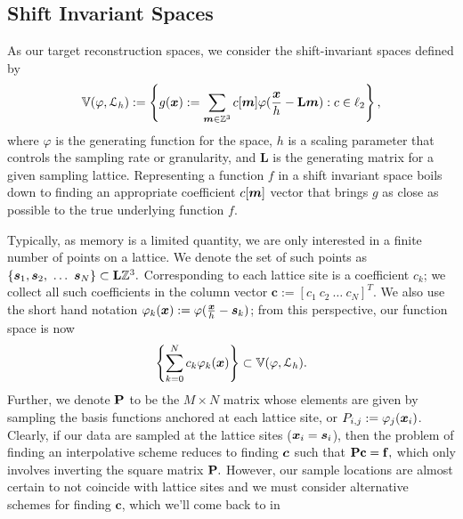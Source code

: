 \subsection{Shift Invariant Spaces} \label{sec:sis_review}
As our target reconstruction spaces, we consider the shift-invariant spaces defined by {\small 
\begin{equation*}
	\mathbb{V}(\varphi,  \mathcal{L}_h) := \left\{ g(\boldsymbol{x}) := \displaystyle\sum_{\boldsymbol{m} \in \mathbb{Z}^3} c[\boldsymbol{m}]\varphi(\frac{\boldsymbol{x}}{h} - \mathbf{L}\boldsymbol{m}) : c \in \ell_2 \right\},
\end{equation*}}
where $\varphi$ is the generating function for the space, $h$ is a scaling parameter that controls the sampling rate or granularity, and $\mathbf{L}$ is the generating matrix for a given sampling lattice.
Representing a function $f$ in a shift invariant space boils down to finding an appropriate coefficient $c[\boldsymbol{m}]$ vector that brings $g$ as close as possible to the true underlying function $f$. 

Typically, as memory is a limited quantity, we are only interested in a finite number of points on a lattice. 
We denote the set of such points as $\{\vect{s}_1,\vect{s}_2,\ \hdots  \ \vect{s}_N\} \subset \mathbf{L}\intn^3.$ 
Corresponding to each lattice site is a coefficient $c_k$; we collect all such coefficients in the column vector $\mathbf{c}:=\left[c_1 \ c_2 \ \hdots \ c_N \right]^T.$ 
We also use the short hand notation $\varphi_k(\boldsymbol{x}) := \varphi(\frac{\boldsymbol{x}}{h}-\boldsymbol{s}_k)$; from this perspective, our function space is now {\small 
\begin{equation}
	\left\{ \displaystyle\sum_{k=0}^N c_k \varphi_k(\boldsymbol{x}) \right\} \subset \mathbb{V}(\varphi, \mathcal{L}_h).
\end{equation}}
Further, we denote $\mathbf{\mathbf{P}}$ to be the $M \times N$ matrix whose elements are given by sampling the basis functions anchored at each lattice site, or $P_{i,j} := \varphi_j(\boldsymbol{x}_i)$. 
Clearly, if our data are sampled at the lattice sites ($\boldsymbol{x}_i = \boldsymbol{s}_i$), then the problem of finding an interpolative scheme reduces to finding $\boldsymbol{c}$ such that $\mathbf{\mathbf{P} c=f},$ which only involves inverting the square matrix $\mathbf{\mathbf{P}}.$ 
However, our sample locations are almost certain to not coincide with lattice sites and we must consider alternative schemes for finding $\mathbf{c}$, which we'll come back to in 

